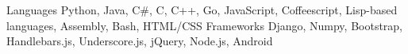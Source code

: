 

\begin{cvskills}
    \cvskill
        {Languages}
        {Python, Java, C\#, C, C++, Go, JavaScript, Coffeescript, Lisp-based languages, Assembly, Bash, HTML/CSS}
    \cvskill
        {Frameworks}
        {Django, Numpy, Bootstrap, Handlebars.js, Underscore.js, jQuery, Node.js, Android}

\end{cvskills}

